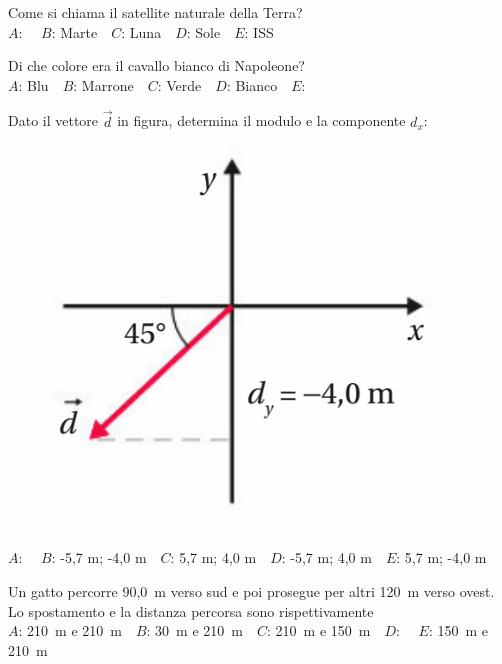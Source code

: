 \def\mcquestionnumber{9}


\mcquestionheader Come si chiama il satellite naturale della Terra?\\
{$A$}: \ \ {$B$}: Marte\ \ {$C$}: Luna\ \ {$D$}: Sole\ \ {$E$}: ISS\ \ 

\mcquestionfooter



\def\mcquestionnumber{10}


\mcquestionheader Di che colore era il cavallo bianco di Napoleone?\\
{$A$}: Blu\ \ {$B$}: Marrone\ \ {$C$}: Verde\ \ {$D$}: Bianco\ \ {$E$}: \ \ 

\mcquestionfooter



\def\mcquestionnumber{11}


\mcquestionheader Dato il vettore $\vec{d}$ in figura, determina il modulo e la componente $d_x$: \begin{figure}[h!]   \begin{center}     \includegraphics[scale=0.35]{vettored.png}   \end{center} \end{figure}\\
{$A$}: \ \ {$B$}: -5,7 m; -4,0 m\ \ {$C$}: 5,7 m; 4,0 m\ \ {$D$}: -5,7 m; 4,0 m\ \ {$E$}: 5,7 m; -4,0 m\ \ 

\mcquestionfooter



\def\mcquestionnumber{12}


\mcquestionheader Un gatto percorre 90,0~m verso sud e poi prosegue per altri 120~m verso ovest. Lo spostamento e la distanza percorsa sono rispettivamente\\
{$A$}: 210~m e 210~m\ \ {$B$}: 30~m e 210~m\ \ {$C$}: 210~m e 150~m\ \ {$D$}: \ \ {$E$}: 150~m e 210~m\ \ 

